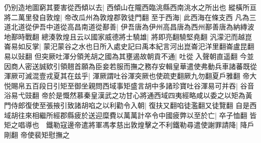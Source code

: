 仍别造地圖窮其要害從西傾以去|{
	西傾山在隴西臨洮縣西南洮水之所出也}
縱橫所亘將二萬里發自敦煌|{
	帝改瓜州為敦煌郡敦徒門翻}
至于西海|{
	此西海在條支西}
凡為三道北道從伊吾中道從高昌南道從鄯善|{
	伊吾唐為伊州高昌唐為西州鄯善唐為納縳波地鄯時戰翻}
總湊敦煌且云以國家威德將士驍雄|{
	將即亮翻驍堅堯翻}
汎濛汜而越崑崙易如反掌|{
	蒙汜蒙谷之水也日所入處史記曰禹本紀言河出崑崙汜洋里翻崙盧昆翻易以䜴翻}
但突厥吐渾分領羌胡之國為其壅遏故朝貢不通|{
	吐從入聲朝直遥翻}
今並因商人密送誠欵引領翹首願為臣妾若服而撫之務存安輯皇華遣使弗動兵車諸蕃既從渾厥可滅混壹戎夏其在兹乎|{
	渾厥謂吐谷渾突厥也使疏吏翻厥九勿翻夏戶雅翻}
帝大悦賜帛五百段日引矩至御坐親問西域事矩盛言胡中多諸珍寶吐谷渾易可并吞|{
	谷音浴易弋豉翻}
帝於是慨然慕秦皇漢武之功甘心將通西域四夷經略咸以委之以矩為黃門侍郎復使至張掖引致諸胡啗之以利勸令入朝|{
	復扶又翻啗徒濫翻又徒覽翻}
自是西域胡往來相繼所經郡縣疲於送迎糜費以萬萬計卒令中國疲弊以至於亡|{
	卒子恤翻}
皆矩之唱導也　鐵勒寇邊帝遣將軍馮孝慈出敦煌擊之不利鐵勒尋遣使謝罪請降|{
	降戶剛翻}
帝使裴矩慰撫之

